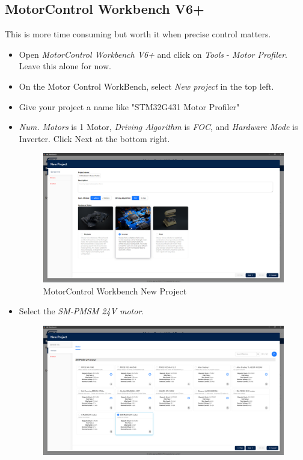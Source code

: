 \documentclass[10pt]{article}
\begin{document}
		\FloatBarrier \subsection{MotorControl Workbench V6+}
            This is more time consuming but worth it when precise control matters. 
            \begin{itemize}
                \item Open \emph{MotorControl Workbench V6+} and click on \emph{Tools} - \emph{Motor Profiler}. Leave this alone for now.
                \item On the Motor Control WorkBench, select \emph{New project} in the top left.
                \item Give your project a name like "STM32G431 Motor Profiler"
                \item \emph{Num. Motors} is 1 Motor, \emph{Driving Algorithm} is \emph{FOC}, and \emph{Hardware Mode} is Inverter. Click Next at the bottom right.
                    \begin{figure}[H]
                        \centerline{\includegraphics[width=\textwidth]{References/MCW Profiler New Project.png}}
                        \caption{MotorControl Workbench New Project}
                    \end{figure}
                \item Select the \emph{SM-PMSM 24V motor}.
                    \begin{figure}[H]
                        \centerline{\includegraphics[width=\textwidth]{References/MCW Profiler Motor.png}}

\end{figure}
\end{itemize}
\end{document}
